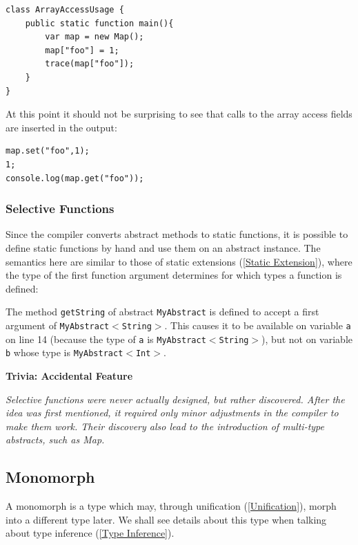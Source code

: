\documentclass{article}
\newcommand{\type}[1]{\texttt{#1}}
\newcommand{\expr}[1]{\texttt{#1}}
\newenvironment{myshaded}
  {\def\FrameCommand{\fboxsep=\topsep\colorbox{bgcolor}}%
  \MakeFramed {\advance\hsize-\width \FrameRestore}}%
 {\endMakeFramed}
\newcommand{\trivia}[2]
	{\begin{myshaded}\noindent\textbf{Trivia: #1}\par\nobreak\noindent\ignorespaces\textit{#2}\end{myshaded}}
\newcommand{\tref}[2]{#1 (\ref{#2})}
\newcommand{\haxe}[2][]{%
}
\begin{document}
\begin{lstlisting}
class ArrayAccessUsage {
	public static function main(){
		var map = new Map();
		map["foo"] = 1;
		trace(map["foo"]);
	}
}
\end{lstlisting}
At this point it should not be surprising to see that calls to the array access fields are inserted in the output:

\begin{lstlisting}
map.set("foo",1);
1;
console.log(map.get("foo"));
\end{lstlisting}


\subsubsection{Selective Functions}
\label{Selective Functions}

Since the compiler converts abstract methods to static functions, it is possible to define static functions by hand and use them on an abstract instance. The semantics here are similar to those of \tref{static extensions}{Static Extension}, where the type of the first function argument determines for which types a function is defined:

\haxe{assets/SelectiveFunction.hx}
The method \expr{getString} of abstract \type{MyAbstract} is defined to accept a first argument of \type{MyAbstract$<$String$>$}. This causes it to be available on variable \expr{a} on line 14 (because the type of \expr{a} is \type{MyAbstract$<$String$>$}), but not on variable \expr{b} whose type is \type{MyAbstract$<$Int$>$}.

\trivia{Accidental Feature}{Selective functions were never actually designed, but rather discovered. After the idea was first mentioned, it required only minor adjustments in the compiler to make them work. Their discovery also lead to the introduction of multi-type abstracts, such as Map. }




\subsection{Monomorph}
\label{Monomorph}

A monomorph is a type which may, through \tref{unification}{Unification}, morph into a different type later. We shall see details about this type when talking about \tref{type inference}{Type Inference}.
\end{document}
